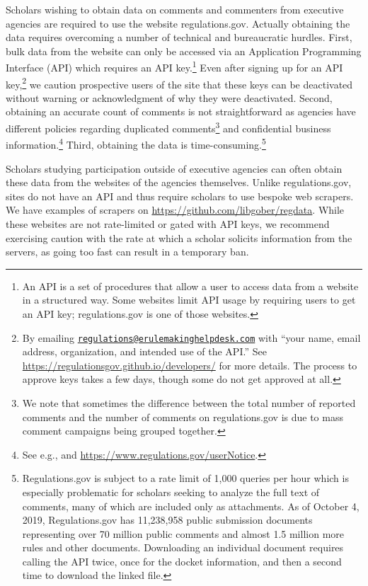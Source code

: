 \documentclass[
      12pt,
        ]{article}
\begin{document}
Scholars wishing to obtain data on comments and commenters from
executive agencies are required to use the website regulations.gov.
Actually obtaining the data requires overcoming a number of technical
and bureaucratic hurdles. First, bulk data from the website can only be
accessed via an Application Programming Interface (API) which requires
an API key.\footnote{An API is a set of procedures that allow a user to
  access data from a website in a structured way. Some websites limit
  API usage by requiring users to get an API key; regulations.gov is one
  of those websites.} Even after signing up for an API key,\footnote{By
  emailing
  \href{mailto:regulations@erulemakinghelpdesk.com}{\nolinkurl{regulations@erulemakinghelpdesk.com}}
  with ``your name, email address, organization, and intended use of the
  API.'' See \url{https://regulationsgov.github.io/developers/} for more
  details. The process to approve keys takes a few days, though some do
  not get approved at all.} we caution prospective users of the site
that these keys can be deactivated without warning or acknowledgment of
why they were deactivated. Second, obtaining an accurate count of
comments is not straightforward as agencies have different policies
regarding duplicated comments\footnote{We note that sometimes the
  difference between the total number of reported comments and the
  number of comments on regulations.gov is due to mass comment campaigns
  being grouped together.} and confidential business
information.\footnote{See e.g., \citet{Lubbers2012} and
  \url{https://www.regulations.gov/userNotice}.} Third, obtaining the
data is time-consuming.\footnote{Regulations.gov is subject to a rate
  limit of 1,000 queries per hour which is especially problematic for
  scholars seeking to analyze the full text of comments, many of which
  are included only as attachments. As of October 4, 2019,
  Regulations.gov has 11,238,958 public submission documents
  representing over 70 million public comments and almost 1.5 million
  more rules and other documents. Downloading an individual document
  requires calling the API twice, once for the docket information, and
  then a second time to download the linked file.}

Scholars studying participation outside of executive agencies can often
obtain these data from the websites of the agencies themselves. Unlike
regulations.gov, sites do not have an API and thus require scholars to
use bespoke web scrapers. We have examples of scrapers on
\url{https://github.com/libgober/regdata}. While these websites are not
rate-limited or gated with API keys, we recommend exercising caution
with the rate at which a scholar solicits information from the servers,
as going too fast can result in a temporary ban.
\end{document}
